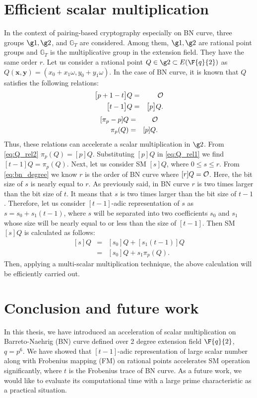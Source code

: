 \section{Efficient scalar multiplication}
In the context of pairing-based cryptography especially on BN curve, three groups $\g1, \g2$, and $\mathbb{G}_T$ are considered. Among them, $\g1, \g2$ are rational point groups and $\mathbb{G}_T$ is the multiplicative group in the extension field. They have the same order $r$. Let us consider a rational point $Q\in \g2 \subset E(\F{q}{2})$ as $Q(\textbf{x},\textbf{y}) =(x_0+x_1\omega, y_0+y_1\omega)$. In the case of BN curve, it is known that $Q$ satisfies the following relations:
\begin{eqnarray}\label{eq:Q_rel1}
\big[p+1-t\big]Q & = & \cal O \nonumber \\
\big[t-1\big]Q  & = & \big[p\big]Q.
\end{eqnarray}
\begin{eqnarray}\label{eq:Q_rel2}
[\pi_p -p]Q & = &\cal O \nonumber \\
\pi_p(Q) & = & [p]Q.
\end{eqnarray}
Thus, these relations can accelerate a scalar multiplication in $\g2$. From \eqref{eq:Q_rel2} $\pi_p(Q)= [p]Q$. Substituting $[p]Q$ in \eqref{eq:Q_rel1} we find $[t-1]Q = \pi_p(Q)$. 
Next, let us consider SM $[s]Q$, where $0 \leq s \leq r$. From \eqref{eq:bn_degree} we know $r$ is the order of BN curve  where $[r]Q=\cal O$. Here, the bit size of $s$ is nearly equal to $r$. As previously said, in BN curve $r$ is two times larger than the bit size of $t$. It means that $s$ is two times larger than the bit size of $t-1$. Therefore, let us consider $[t-1]$-adic representation of $s$ as $s = s_0+s_1(t-1)$, where $s$ will be separated into two coefficients $s_0$ and $s_1$ whose size will be nearly equal to or less than the size of $[t-1]$. Then SM  $[s]Q$ is calculated as follows:
\begin{eqnarray}\label{eq:scalar_mul_Q}
[s]Q & =  & [s_0]Q+[s_1(t-1)]Q \nonumber \\
& =  & [s_0]Q+s_1\pi_p(Q).
\end{eqnarray}
Then, applying a multi-scalar multiplication technique, the above calculation will be efficiently carried out.

\section{Conclusion and future work}
In this thesis, we have introduced an acceleration of scalar multiplication on Barreto-Naehrig (BN) curve defined over 2 degree extension field $\F{q}{2}$, $q=p^6$. We have showed that $[t-1]$-adic representation of large scalar number along with Frobenius mapping (FM) on rational points accelerates SM operation significantly, where $t$ is the Frobenius trace of BN curve. As a future work, we would like to evaluate its computational time with a large prime characteristic as a practical situation.


